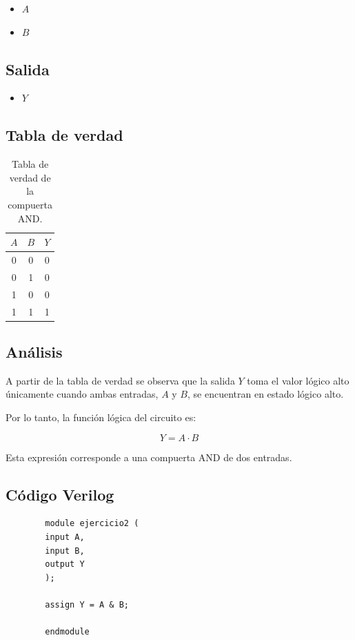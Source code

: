\documentclass[a4paper,12pt]{article}
\begin{document}
	\begin{itemize}
		\item $A$
		\item $B$
	\end{itemize}
	
	\subsection{Salida}
	
	\begin{itemize}
		\item $Y$
	\end{itemize}
	
	\subsection{Tabla de verdad}
	
	\begin{table}[h]
		\centering
		\begin{tabular}{|c|c|c|}
			\hline
			$A$ & $B$ & $Y$ \\ \hline
			0 & 0 & 0 \\ \hline
			0 & 1 & 0 \\ \hline
			1 & 0 & 0 \\ \hline
			1 & 1 & 1 \\ \hline
		\end{tabular}
		\caption{Tabla de verdad de la compuerta AND.}
		\label{tab:ej2_and}
	\end{table}
	
	\subsection{Análisis}
	
	A partir de la tabla de verdad se observa que la salida $Y$ toma el valor lógico alto únicamente cuando ambas entradas, $A$ y $B$, se encuentran en estado lógico alto.
	
	Por lo tanto, la función lógica del circuito es:
	
	\[
	Y = A \cdot B
	\]
	
	Esta expresión corresponde a una compuerta AND de dos entradas.
	
	\subsection{Código Verilog}
	
	\begin{verbatim}
		module ejercicio2 (
		input A,
		input B,
		output Y
		);
		
		assign Y = A & B;
		
		endmodule
	\end{verbatim}
	
\end{document}
